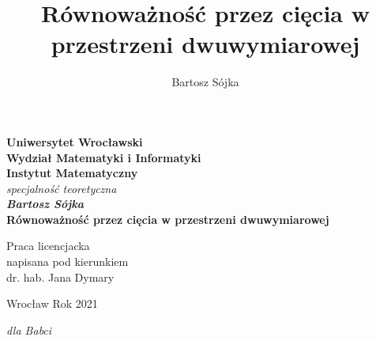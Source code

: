 \documentclass[a4paper, 12pt, twosided]{article}
\title{Równoważność przez cięcia w przestrzeni dwuwymiarowej}
\author{Bartosz Sójka}
\begin{document}
\thispagestyle{empty}
\begin{center}
\textbf{\large Uniwersytet Wrocławski\\
Wydział Matematyki i Informatyki\\
Instytut Matematyczny}\\
\textit{\large specjalność teoretyczna}\\
\vspace{4cm}
\textbf{\textit{\large Bartosz Sójka}\\
\vspace{0.5cm}
{\Large Równoważność przez cięcia w przestrzeni dwuwymiarowej}}\\
\end{center}
\vspace{3cm}
{\large \hspace*{6.5cm}Praca licencjacka\\
\hspace*{6.5cm}napisana pod kierunkiem\\
\hspace*{6.5cm}dr. hab. Jana Dymary }\\
\vfill
\begin{center}
{\large Wrocław Rok 2021}\\
\end{center}
\newpage
\null
\thispagestyle{empty}

\newpage
\thispagestyle{empty}
\vspace*{19cm}
\hspace*{10cm}
\textit{dla Babci}
\newpage
\null
\thispagestyle{empty}
\newpage
\tableofcontents
\end{document}
